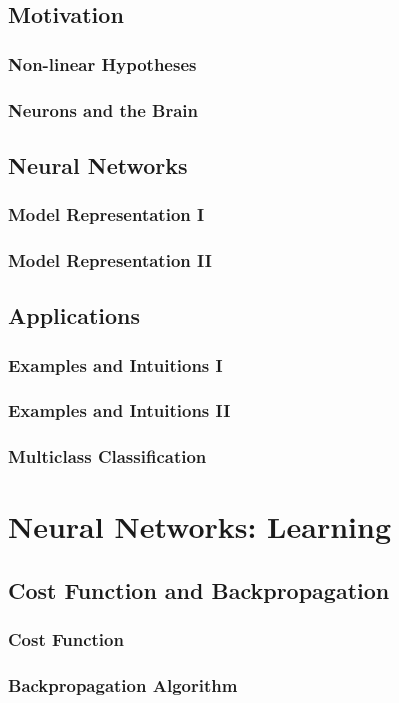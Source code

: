 \documentclass{article}
\begin{document}
\subsection{Motivation}
\subsubsection{Non-linear Hypotheses}
\subsubsection{Neurons and the Brain}
\subsection{Neural Networks}
\subsubsection{Model Representation I}
\subsubsection{Model Representation II}
\subsection{Applications}
\subsubsection{Examples and Intuitions I}
\subsubsection{Examples and Intuitions II}
\subsubsection{Multiclass Classification}

\section{Neural Networks: Learning}
\subsection{Cost Function and Backpropagation}
\subsubsection{Cost Function}
\subsubsection{Backpropagation Algorithm}
\end{document}
